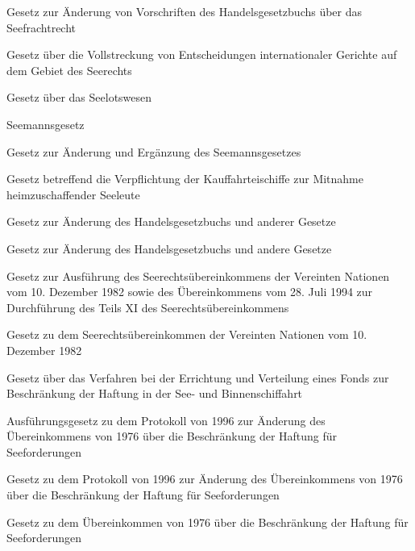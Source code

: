 \item[{SeeFrRÄndG}] Gesetz zur Änderung von Vorschriften des Handelsgesetzbuchs über das Seefrachtrecht

\item[{SeeGVG}] Gesetz über die Vollstreckung von Entscheidungen internationaler Gerichte auf dem Gebiet des Seerechts

\item[{SeelotG}] Gesetz über das Seelotswesen

\item[{SeemG}] Seemannsgesetz

\item[{SeemGÄndG}] Gesetz zur Änderung und Ergänzung des Seemannsgesetzes

\item[{SeemHeimTportG}] Gesetz betreffend die Verpflichtung der Kauffahrteischiffe zur Mitnahme heimzuschaffender Seeleute

\item[{SeeRÄndG}] Gesetz zur Änderung des Handelsgesetzbuchs und anderer Gesetze

\item[{SeeRÄndG-2}] Gesetz zur Änderung des Handelsgesetzbuchs und andere Gesetze

\item[{SeeRÜbkAG}] Gesetz zur Ausführung des Seerechtsübereinkommens der Vereinten Nationen vom 10. Dezember 1982 sowie des Übereinkommens vom 28. Juli 1994 zur Durchführung des Teils XI des Seerechtsübereinkommens

\item[{SeeRÜbkG}] Gesetz zu dem Seerechtsübereinkommen der Vereinten Nationen vom 10. Dezember 1982

\item[{SeeRVertO-1986}] Gesetz über das Verfahren bei der Errichtung und Verteilung eines Fonds zur Beschränkung der Haftung in der See- und Binnenschiffahrt

\item[{SeeSchHaftÜbk1976ÄndProtAG}] Ausführungsgesetz zu dem Protokoll von 1996 zur Änderung des Übereinkommens von 1976 über die Beschränkung der Haftung für Seeforderungen

\item[{SeeSchHaftÜbk1976ÄndProtG}] Gesetz zu dem Protokoll von 1996 zur Änderung des Übereinkommens von 1976 über die Beschränkung der Haftung für Seeforderungen

\item[{SeeSchHaftÜbk1976G}] Gesetz zu dem Übereinkommen von 1976 über die Beschränkung der Haftung für Seeforderungen


